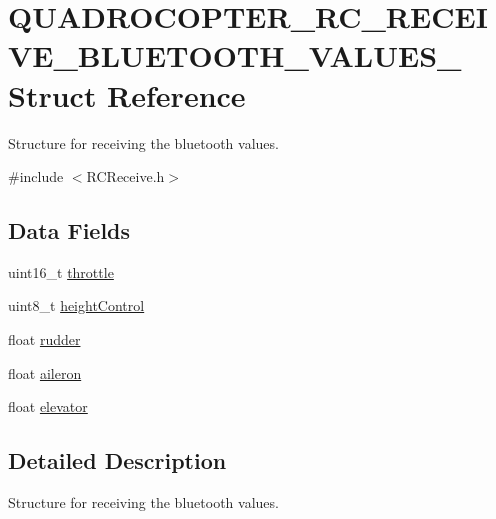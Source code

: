\hypertarget{struct_q_u_a_d_r_o_c_o_p_t_e_r___r_c___r_e_c_e_i_v_e___b_l_u_e_t_o_o_t_h___v_a_l_u_e_s__}{}\section{Q\+U\+A\+D\+R\+O\+C\+O\+P\+T\+E\+R\+\_\+\+R\+C\+\_\+\+R\+E\+C\+E\+I\+V\+E\+\_\+\+B\+L\+U\+E\+T\+O\+O\+T\+H\+\_\+\+V\+A\+L\+U\+E\+S\+\_\+ Struct Reference}
\label{struct_q_u_a_d_r_o_c_o_p_t_e_r___r_c___r_e_c_e_i_v_e___b_l_u_e_t_o_o_t_h___v_a_l_u_e_s__}


Structure for receiving the bluetooth values.  




{\ttfamily \#include $<$R\+C\+Receive.\+h$>$}

\subsection*{Data Fields}
\begin{DoxyCompactItemize}
\item 
uint16\+\_\+t \hyperlink{struct_q_u_a_d_r_o_c_o_p_t_e_r___r_c___r_e_c_e_i_v_e___b_l_u_e_t_o_o_t_h___v_a_l_u_e_s___acd650840da79ce4d3453425ad4cd4ae0}{throttle}
\item 
uint8\+\_\+t \hyperlink{struct_q_u_a_d_r_o_c_o_p_t_e_r___r_c___r_e_c_e_i_v_e___b_l_u_e_t_o_o_t_h___v_a_l_u_e_s___acb423196f1a0c1584f3b4c6436b25cb5}{height\+Control}
\item 
float \hyperlink{struct_q_u_a_d_r_o_c_o_p_t_e_r___r_c___r_e_c_e_i_v_e___b_l_u_e_t_o_o_t_h___v_a_l_u_e_s___a6ce3ff8126ce78562ca5228b5cb8253f}{rudder}
\item 
float \hyperlink{struct_q_u_a_d_r_o_c_o_p_t_e_r___r_c___r_e_c_e_i_v_e___b_l_u_e_t_o_o_t_h___v_a_l_u_e_s___a738f10143ffa3f4c345e2a8c65e6537c}{aileron}
\item 
float \hyperlink{struct_q_u_a_d_r_o_c_o_p_t_e_r___r_c___r_e_c_e_i_v_e___b_l_u_e_t_o_o_t_h___v_a_l_u_e_s___af93f91414ea072177ab5986b0afb43f6}{elevator}
\end{DoxyCompactItemize}


\subsection{Detailed Description}
Structure for receiving the bluetooth values. 

